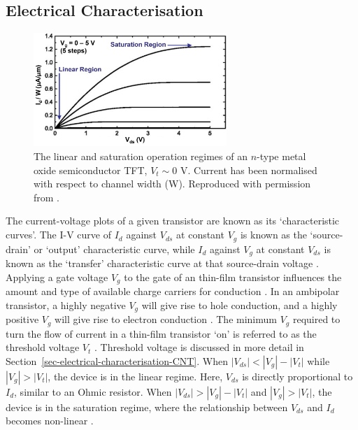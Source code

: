 \documentclass[
  a4paper,
]{scrbook}
\begin{document}
\hypertarget{electrical-characterisation}{%
\subsection{Electrical
Characterisation}\label{electrical-characterisation}}

\begin{figure}

{\centering \includegraphics[width=0.65\textwidth,height=\textheight]{figures/ch2/linear_region_edit.png}

}

\caption{\label{fig-linear-region}The linear and saturation operation
regimes of an \(n\)-type metal oxide semiconductor TFT, \(V_{t} \sim 0\)
V. Current has been normalised with respect to channel width (W).
Reproduced with permission from \autocite{Petti2016}.}

\end{figure}

The current-voltage plots of a given transistor are known as its
`characteristic curves'. The I-V curve of \(I_d\) against \(V_{ds}\) at
constant \(V_g\) is known as the `source-drain' or `output'
characteristic curve, while \(I_d\) against \(V_g\) at constant
\(V_{ds}\) is known as the `transfer' characteristic curve at that
source-drain voltage \autocite{Kauffman2008,Petti2016,Shkodra2021}.
Applying a gate voltage \(V_g\) to the gate of an thin-film transistor
influences the amount and type of available charge carriers for
conduction \autocite{Avouris2007,Tran2016,Heller2009a}. In an ambipolar
transistor, a highly negative \(V_g\) will give rise to hole conduction,
and a highly positive \(V_g\) will give rise to electron conduction
\autocite{Avouris2007,Yao2021,Li2023}. The minimum \(V_g\) required to
turn the flow of current in a thin-film transistor `on' is referred to
as the threshold voltage \(V_t\)
\autocite{Petti2016,Shkodra2021,Li2023}. Threshold voltage is discussed
in more detail in Section~\ref{sec-electrical-characterisation-CNT}.
When \(|V_{ds}| < |V_g| - |V_t|\) while \(|V_g|>|V_t|\), the device is
in the linear regime. Here, \(V_{ds}\) is directly proportional to
\(I_{d}\), similar to an Ohmic resistor. When
\(|V_{ds}| > |V_g| - |V_t|\) and \(|V_g|>|V_t|\), the device is in the
saturation regime, where the relationship between \(V_{ds}\) and
\(I_{d}\) becomes non-linear \autocite{Petti2016,Shkodra2021,Li2023}.
\end{document}
